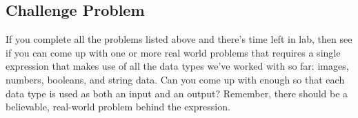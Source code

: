 \documentclass[nobib]{tufte-handout}
\begin{document}
\subsection{Challenge Problem}

If you complete all the problems listed above and there's time left in lab, then see if you can come up with one or more real world problems that requires a single expression that makes use of all the data types we've worked with so far: images, numbers, booleans, and string data. Can you come up with enough so that each data type is used as both an input and an output? Remember, there should be a believable, real-world problem behind the expression. 
\end{document}
